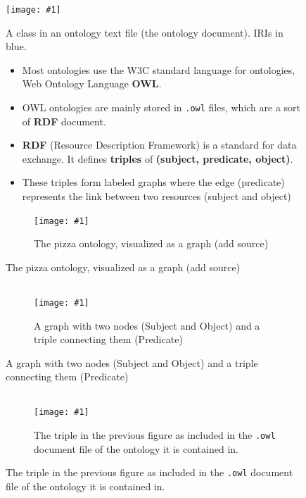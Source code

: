 \documentclass[english, xcolor=dvipsnames, aspectratio=169]{beamer}
\newcommand{\includefigurelarger}[2]
{
    \begin{figure}[h]
    \caption{#2}
    \centering
    \texttt{[image: \#1]}
    \end{figure}
}
\newcommand{\includefiguremedium}[2]
{
    \begin{figure}[h]
    \caption{#2}
    \centering
    \texttt{[image: \#1]}
    \end{figure}
}
\newcommand{\subsectiontitle}{}
\begin{document}
% 

\begin{frame}{\subsectiontitle}
 \raggedleft
 \includefiguremedium{class.pdf}{A class in an ontology text file (the ontology document). IRIs in blue.}
\end{frame}

%

\begin{frame}{\subsectiontitle}
    \begin{figure}
        \begin{minipage}[b]{0.55\linewidth}
 			\begin{itemize}
\item Most ontologies use the W3C standard language for ontologies, Web Ontology Language \textbf{OWL}.
\item OWL ontologies are mainly stored in \texttt{.owl} files, which are a sort of \textbf{RDF} document.
\item \textbf{RDF} (Resource Description Framework) is a standard for data exchange. It defines \textbf{triples} of \textbf{(subject, predicate, object)}.
\item These triples form labeled graphs where the edge (predicate) represents the link between two resources (subject and object)
    		\end{itemize}
        \end{minipage}
    \hfill
     \begin{minipage}[b]{0.4\linewidth}
            \centering
            \includefigurelarger{pizzaontology.png}{The pizza ontology, visualized as a graph (add source)}
        \end{minipage}
    \end{figure}
\end{frame}


% 
\subsection{\subsectiontitle}
\begin{frame}{\subsectiontitle}

     
\begin{figure}
    
    \centering
	\includefigurelarger{rdf-graph-triple.pdf}{A graph with two nodes (Subject and Object) and a triple connecting them (Predicate)}
    \end{figure}
\end{frame}

% 
\subsection{\subsectiontitle}
\begin{frame}{\subsectiontitle}

     
\begin{figure}
    \centering
	\includefigurelarger{rdf-owl.pdf}{The triple in the previous figure as included in the \texttt{.owl} document file of the ontology it is contained in.}
    \end{figure}
\end{frame}
\end{document}
